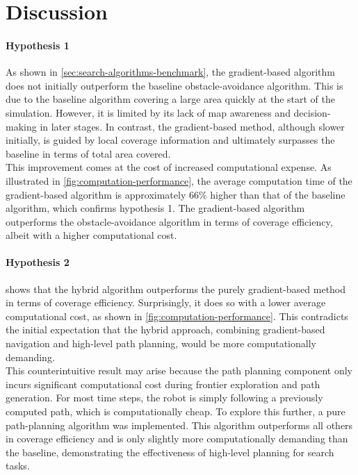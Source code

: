 \section{Discussion}
\paragraph{Hypothesis 1}
As shown in \cref{sec:search-algorithms-benchmark}, the gradient-based algorithm does not initially outperform the baseline obstacle-avoidance algorithm. This is due to the baseline algorithm covering a large area quickly at the start of the simulation. However, it is limited by its lack of map awareness and decision-making in later stages. In contrast, the gradient-based method, although slower initially, is guided by local coverage information and ultimately surpasses the baseline in terms of total area covered.\\

This improvement comes at the cost of increased computational expense. As illustrated in \cref{fig:computation-performance}, the average computation time of the gradient-based algorithm is approximately 66\% higher than that of the baseline algorithm, which confirms hypothesis 1. The gradient-based algorithm outperforms the obstacle-avoidance algorithm in terms of coverage efficiency, albeit with a higher computational cost.

\paragraph{Hypothesis 2}
 shows that the hybrid algorithm outperforms the purely gradient-based method in terms of coverage efficiency. Surprisingly, it does so with a lower average computational cost, as shown in \cref{fig:computation-performance}. This contradicts the initial expectation that the hybrid approach, combining gradient-based navigation and high-level path planning, would be more computationally demanding. \\

This counterintuitive result may arise because the path planning component only incurs significant computational cost during frontier exploration and path generation. For most time steps, the robot is simply following a previously computed path, which is computationally cheap. To explore this further, a pure path-planning algorithm was implemented. This algorithm outperforms all others in coverage efficiency and is only slightly more computationally demanding than the baseline, demonstrating the effectiveness of high-level planning for search tasks. \\

